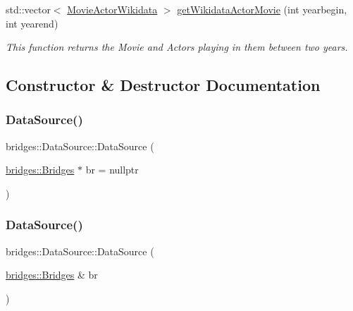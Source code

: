 \begin{DoxyCompactItemize}
\item 
std\+::vector$<$ \mbox{\hyperlink{classbridges_1_1dataset_1_1_movie_actor_wikidata}{Movie\+Actor\+Wikidata}} $>$ \mbox{\hyperlink{classbridges_1_1_data_source_a25b33736b4ae9ffea5fe4ebf5dbb3a63}{get\+Wikidata\+Actor\+Movie}} (int yearbegin, int yearend)
\begin{DoxyCompactList}\small\item\em This function returns the Movie and Actors playing in them between two years. \end{DoxyCompactList}\end{DoxyCompactItemize}


\subsection{Constructor \& Destructor Documentation}
\mbox{\label{classbridges_1_1_data_source_afc95b52d2ca03a92c1f1ee1594a097c7}} 
\subsubsection{\texorpdfstring{Data\+Source()}{DataSource()}\hspace{0.1cm}{\footnotesize\ttfamily [1/2]}}
{\footnotesize\ttfamily bridges\+::\+Data\+Source\+::\+Data\+Source (\begin{DoxyParamCaption}\item[{\mbox{\hyperlink{classbridges_1_1_bridges}{bridges\+::\+Bridges}} $\ast$}]{br = {\ttfamily nullptr} }\end{DoxyParamCaption})\hspace{0.3cm}{\ttfamily [inline]}}

\mbox{\label{classbridges_1_1_data_source_a0da0dc59d798aa3266df7931a396a4c9}} 
\subsubsection{\texorpdfstring{Data\+Source()}{DataSource()}\hspace{0.1cm}{\footnotesize\ttfamily [2/2]}}
{\footnotesize\ttfamily bridges\+::\+Data\+Source\+::\+Data\+Source (\begin{DoxyParamCaption}\item[{\mbox{\hyperlink{classbridges_1_1_bridges}{bridges\+::\+Bridges}} \&}]{br }\end{DoxyParamCaption})\hspace{0.3cm}{\ttfamily [inline]}}



